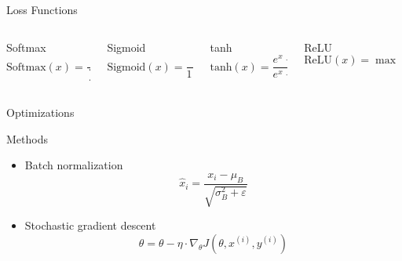 \begin{frame}{Loss Functions}
	\begin{columns}
		\begin{column}{0.25\textwidth}
			\begin{block}{Softmax}
				\begin{equation}
					\text{Softmax}(x)=\frac{e^{x_i}}{\sum_i e^{x_i}}
				\end{equation}
			\end{block}
		\end{column}
		\pause
		\begin{column}{0.25\textwidth}
			\begin{block}{Sigmoid}
				\begin{equation}
					\text{Sigmoid}(x)=\frac{1}{1+e^{-x}}
				\end{equation}
			\end{block}
		\end{column}
		\pause
		\begin{column}{0.25\textwidth}
			\begin{block}{tanh}
				\begin{equation}
					\text{tanh}(x)=\frac{e^x-e^{-x}}{e^x+e^{-x}}
				\end{equation}
			\end{block}
		\end{column}
		\pause
		\begin{column}{0.25\textwidth}
			\begin{block}{ReLU}
				\begin{equation}
					\text{ReLU}(x)=\max(0,x)
				\end{equation}
			\end{block}
		\end{column}
	\end{columns}
\end{frame}

\begin{frame}{Optimizations}
	\begin{block}{Methods}
		\begin{itemize}
			\item Batch normalization
			\begin{equation}
				{\hat{x}}_i=\frac{x_i-\mu_B}{\sqrt{\sigma^2_B+\varepsilon}}
			\end{equation}
			\item Stochastic gradient descent
			\begin{equation}
				\theta=\theta-\eta\cdot\nabla_\theta J(\theta,x^{(i)},y^{(i)})
			\end{equation}
		\end{itemize}
	\end{block}
\end{frame}

